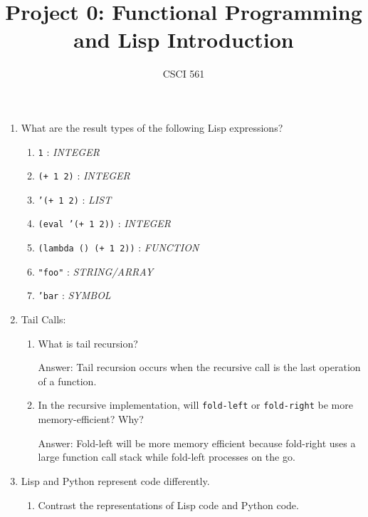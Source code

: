 \documentclass[12pt,letterpaper]{ntdhw}
\title{Project 0: Functional Programming and Lisp Introduction}
\author{CSCI 561}
\begin{document}
\pagestyle{fancyplain}

\maketitle
\thispagestyle{fancyplain}

\begin{enumerate}

  \item What are the result types of the following Lisp expressions?
  \begin{enumerate}
    \item {\tt 1} : \emph{
      INTEGER
    }
    \item {\tt (+ 1 2)} : \emph{
      INTEGER
    }
    \item {\tt '(+ 1 2)} : \emph{
      LIST
    }
    \item {\tt (eval '(+ 1 2))} : \emph{
      INTEGER
    }
    \item {\tt (lambda () (+ 1 2))} : \emph{
      FUNCTION
    }
    \item {\tt "foo"} : \emph{
      STRING/ARRAY
    }
    \item {\tt 'bar} : \emph{
      SYMBOL
    }
  \end{enumerate}

  \item Tail Calls:
  \begin{enumerate}
    \item What is tail recursion?

    \begin{emph}
      Answer: Tail recursion occurs when the recursive call is the last operation of a function.
    \end{emph}

    \item In the recursive implementation, will {\tt fold-left} or
    {\tt fold-right} be more memory-efficient?  Why?

    \begin{emph}
      Answer: Fold-left will be more memory efficient because fold-right uses a large function call stack while fold-left processes on the go.
    \end{emph}
  \end{enumerate}

  \item Lisp and Python represent code differently.

  \begin{enumerate}
    \item Contrast the representations of Lisp code and Python code.


\end{enumerate}
\end{enumerate}
\end{document}
